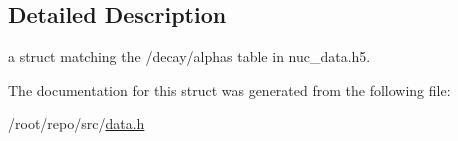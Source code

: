 \subsection{Detailed Description}
a struct matching the \textquotesingle{}/decay/alphas\textquotesingle{} table in nuc\+\_\+data.\+h5. 

The documentation for this struct was generated from the following file\+:\begin{DoxyCompactItemize}
\item 
/root/repo/src/\hyperlink{data_8h}{data.\+h}\end{DoxyCompactItemize}
